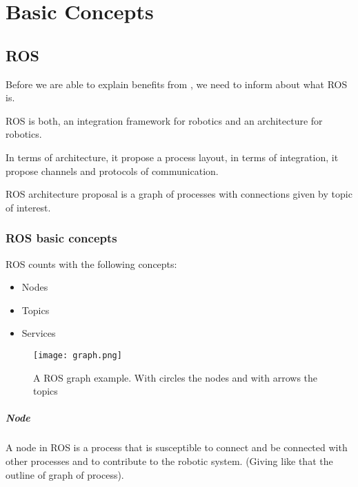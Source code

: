 \documentclass[a4paper,10pt,twoside]{book}
\begin{document}
\fi
\sloppy
\chapter{Basic Concepts}

\section{ROS}

	Before we are able to explain benefits from \pharos, we need to inform about what ROS is. 
	
	ROS is both, an integration framework for robotics and an architecture for robotics.
	
	In terms of architecture, it propose a process layout, in terms of integration, it propose channels and protocols of communication. 
	 
	ROS architecture proposal is a graph of processes with connections given by topic of interest. 
	
	\subsection{ROS basic concepts}
	
	ROS counts with the following concepts:
	 
	 \begin{itemize}
		\item Nodes
		\item Topics 
		\item Services
	 \end{itemize}

	\begin{figure}[!htbp]
  		\centering
    		\texttt{[image: graph.png]}
		\caption{A ROS graph example. With circles the nodes and with arrows the topics }
		\centering
	\end{figure}
	

	
		 \paragraph{Node}
		 	A node in ROS is a process that is susceptible to connect and be connected with other processes and to contribute to the robotic system. (Giving like that the outline of graph of process).
			
\end{document}
